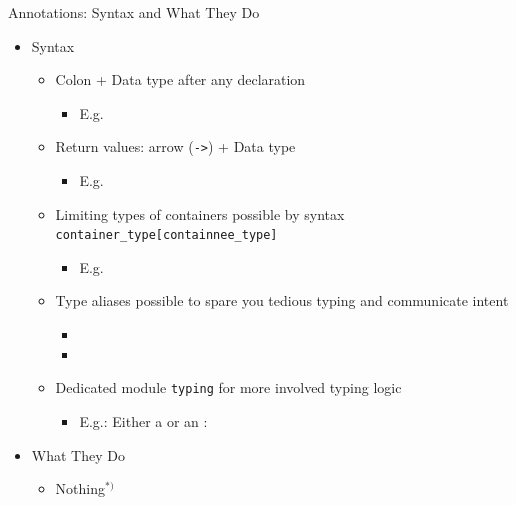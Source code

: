 \begin{frame}{Annotations: Syntax and What They Do}
%
\begin{itemize}
\item Syntax
	\begin{itemize}
	\item Colon + Data type after any declaration
		\begin{itemize}
		\item E.\;g. 
		\end{itemize}
	\item Return values: arrow (\texttt{->}) + Data type
		\begin{itemize}
		\item E.\;g. 
		\end{itemize}
	\item Limiting types of containers possible by syntax \texttt{container\_type[containnee\_type]}
		\begin{itemize}
		\item E.\;g. 
		\end{itemize}
	\item Type aliases possible to spare you tedious typing and communicate intent
		\begin{itemize}
		\item {} 
		\item {}
		\end{itemize}
	\item Dedicated module \texttt{typing} for more involved typing logic
		\begin{itemize}
		\item E.\;g.: Either a  or an : 
		\end{itemize}
	\end{itemize}
\item What They Do
	\begin{itemize}
	\item Nothing$^{*)}$
	\end{itemize}
\end{itemize}
%
\end{frame}


